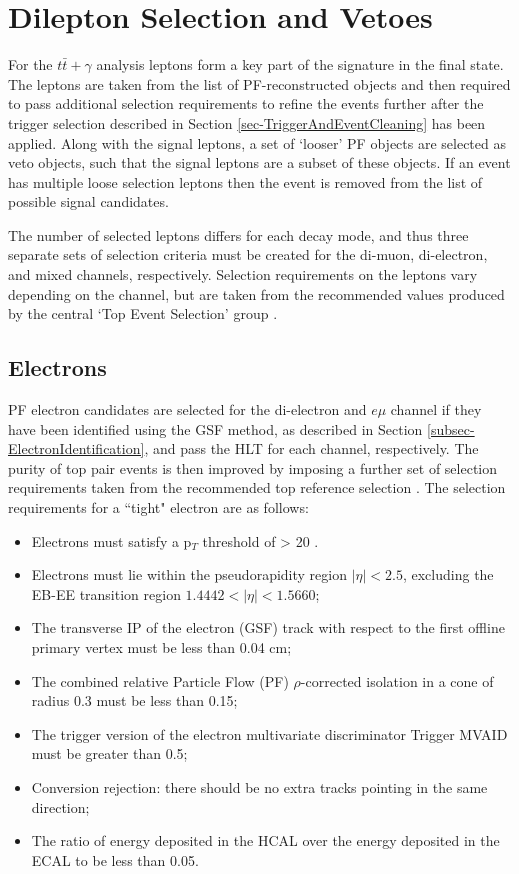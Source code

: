 
\section{Dilepton Selection and Vetoes}

For the $t\bar{t}+\gamma$ analysis leptons form a key part of the signature in the final state. The leptons are taken from the list of PF-reconstructed objects and then required to pass additional selection requirements to refine the events further after the trigger selection described in Section \ref{sec-TriggerAndEventCleaning} has been applied. Along with the signal leptons, a set of `looser' PF objects are selected as veto objects, such that the signal leptons are a subset of these objects. If an event has multiple loose selection leptons then the event is removed from the list of possible signal candidates.

The number of selected leptons differs for each decay mode, and thus three separate sets of selection criteria must be created for the di-muon, di-electron, and mixed channels, respectively. Selection requirements on the leptons vary depending on the channel, but are taken from the recommended values produced by the central `Top Event Selection' group \cite{TopEventSelection}. 

\subsection{Electrons}

PF electron candidates are selected for the di-electron and $e\mu$ channel if they have been identified using the GSF method, as described in Section \ref{subsec-ElectronIdentification}, and pass the HLT for each channel, respectively. The purity of top pair events is then improved by imposing a further set of selection requirements taken from the recommended top reference selection \cite{TOPEGM1}. The selection requirements for a ``tight" electron are as follows:

\begin{itemize}
	\item Electrons must satisfy a p$_T$ threshold of > 20 \GeV.
	\item Electrons must lie within the pseudorapidity region $|\eta| < 2.5$, excluding the EB-EE transition region $1.4442 < |\eta| < 1.5660$;
	\item The transverse IP of the electron (GSF) track with respect to the first offline primary vertex must be less than 0.04 cm; 
	\item The combined relative Particle Flow (PF) $\rho$-corrected isolation in a cone of radius 0.3 must be less than 0.15;
	\item The trigger version of the electron multivariate discriminator Trigger MVAID must be greater than 0.5;
	\item Conversion rejection: there should be no extra tracks pointing in the same direction;
	\item The ratio of energy deposited in the HCAL over the energy deposited in the ECAL to be less than 0.05.
\end{itemize} 

